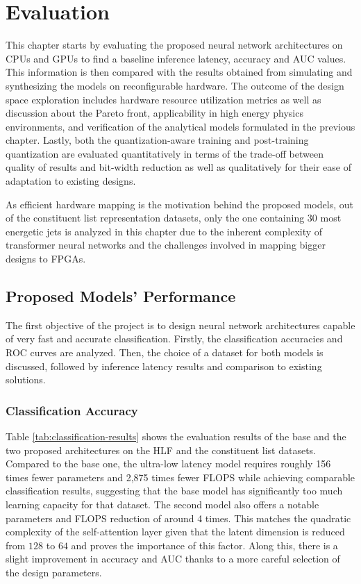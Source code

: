 \chapter{Evaluation}\label{evaluation}
This chapter starts by evaluating the proposed neural network architectures on CPUs and GPUs to find a baseline inference latency, accuracy and AUC values. This information is then compared with the results obtained from simulating and synthesizing the models on reconfigurable hardware. The outcome of the design space exploration includes hardware resource utilization metrics as well as discussion about the Pareto front, applicability in high energy physics environments, and verification of the analytical models formulated in the previous chapter. Lastly, both the quantization-aware training and post-training quantization are evaluated quantitatively in terms of the trade-off between quality of results and bit-width reduction as well as qualitatively for their ease of adaptation to existing designs.

As efficient hardware mapping is the motivation behind the proposed models, out of the constituent list representation datasets, only the one containing 30 most energetic jets is analyzed in this chapter due to the inherent complexity of transformer neural networks and the challenges involved in mapping bigger designs to FPGAs.

\section{Proposed Models' Performance}
The first objective of the project is to design neural network architectures capable of very fast and accurate classification. Firstly, the classification accuracies and ROC curves are analyzed. Then, the choice of a dataset for both models is discussed, followed by inference latency results and comparison to existing solutions.

\subsection{Classification Accuracy}
Table \ref{tab:classification-results} shows the evaluation results of the base and the two proposed architectures on the HLF and the constituent list datasets. Compared to the base one, the ultra-low latency model requires roughly 156 times fewer parameters and 2,875 times fewer FLOPS while achieving comparable classification results, suggesting that the base model has significantly too much learning capacity for that dataset. The second model also offers a notable parameters and FLOPS reduction of around 4 times. This matches the quadratic complexity of the self-attention layer given that the latent dimension is reduced from \(128\) to \(64\) and proves the importance of this factor. Along this, there is a slight improvement in accuracy and AUC thanks to a more careful selection of the design parameters.

